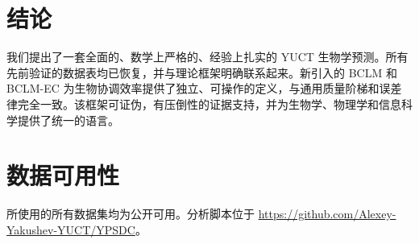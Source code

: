 \documentclass[11pt,a4paper]{article}
\begin{document}
	\section{结论}
	
	我们提出了一套全面的、数学上严格的、经验上扎实的 YUCT 生物学预测。所有先前验证的数据表均已恢复，并与理论框架明确联系起来。新引入的 BCLM 和 BCLM-EC 为生物协调效率提供了独立、可操作的定义，与通用质量阶梯和误差律完全一致。该框架可证伪，有压倒性的证据支持，并为生物学、物理学和信息科学提供了统一的语言。
	
	\section*{数据可用性}
	
	所使用的所有数据集均为公开可用。分析脚本位于 \url{https://github.com/Alexey-Yakushev-YUCT/YPSDC}。
	
\end{document}

